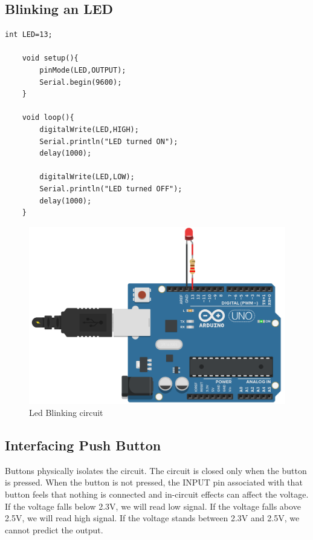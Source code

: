     \subsection{Blinking an LED}
    \begin{lstlisting}[style=CStyle]
    int LED=13;
    
    void setup(){
        pinMode(LED,OUTPUT);		
        Serial.begin(9600);
    }
    
    void loop(){
        digitalWrite(LED,HIGH);
        Serial.println("LED turned ON");
        delay(1000);
    
        digitalWrite(LED,LOW);
        Serial.println("LED turned OFF");
        delay(1000);
    }
    \end{lstlisting}
    \begin{figure}
        \centering
        \includegraphics{Images/Programing_Arduino/led_blink_ckt.png}
        \caption{Led Blinking circuit}
    \end{figure}

    \newpage
    \subsection{Interfacing Push Button}
    \par Buttons physically isolates the circuit. The circuit is closed only when the button is pressed. When the button is not pressed, the INPUT pin associated with that button feels that nothing is connected and in-circuit effects can affect the voltage. If the voltage falls below 2.3V, we will read low signal. If the voltage falls above 2.5V, we will read high signal. If the voltage stands between 2.3V and 2.5V, we cannot predict the output. 
    
